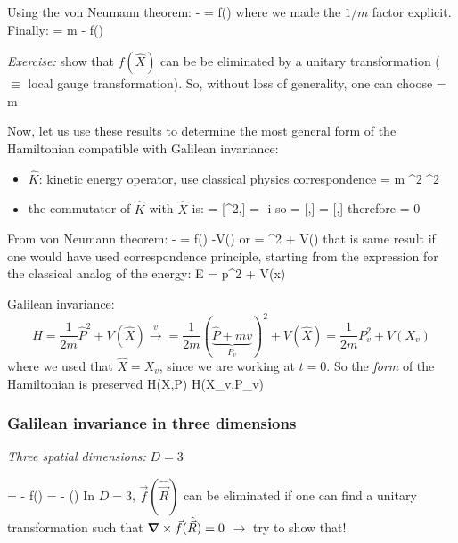 \documentclass[12pt]{article}
\begin{document}
Using the von Neumann theorem:
\be
{} -  =  f()
\ee
where we made the $1/m$ factor explicit. Finally:
\setcounter{equation}{77}
\be
{} = m - f()
\ee

 \emph{Exercise:} show that $f(\hat{X})$ can be
be eliminated by a unitary transformation 
($\equiv$ local gauge transformation).
So, without loss of generality, one can choose
\be
{} = m 
\label{eq:g79}
\ee

Now, let us use these results to determine the
most general form of the Hamiltonian compatible
with Galilean invariance:
\begin{itemize}
\item $\hat{K}$: kinetic energy operator, use classical physics
correspondence
\be
{} =  m ^2
  ^2
\ee
\item the commutator of $\hat{K}$ with $\hat{X}$ is:
 = 
[^2,] = -i\hbar{}
\ee
so
\be
{} =  [,]
 = [,]
\ee
therefore
 = 0
\ee
\end{itemize}
From von Neumann theorem:
\be
{}- = f() \equiv -V()
\ee
or
\be
{} =  ^2 + V()
\ee
that is same result if one would have used correspondence
principle, starting from the expression for the
classical analog of the energy:
\be
E =  p^2 + V(x)
\ee

Galilean invariance:
\[
H = \frac{1}{2m} \hat{P}^2 + V(\hat{X}) \xrightarrow{v}
= \frac{1}{2m} (
\underbrace{\hat{P}+mv}_{P_v})^2 + V(\hat{X})
= \frac{1}{2m} P_v^2 + V(X_v)
\]
where we used that $\hat{X} = X_v$, since we are working at $t=0$.
So the \emph{form} of the Hamiltonian is preserved
\be
H(X,P) \to H(X_v,P_v)
\ee

\subsubsection{Galilean invariance in three dimensions}

\emph{Three spatial dimensions:} $D = 3$

\be
{} =  -  f() \to
{} =  -  () 
\ee
In $D = 3$, $\vec{f}(\hat{\vec{R}})$ can be eliminated if one can
find a unitary transformation such that
$\grad \times \vec{f}(\hat{\vec{R}})= 0$ $\to$ try to show that!
\end{document}
